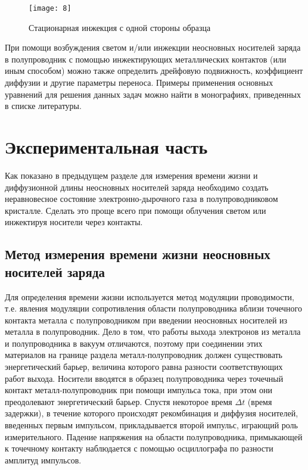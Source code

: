 \documentclass[a4paper,14pt]{extarticle}
\begin{document}
\begin{figure}[H]
	\centering
	\texttt{[image: 8]}
	\caption{Стационарная инжекция с одной стороны образца}
	\label{fig:figure7}
\end{figure}

При помощи возбуждения светом и/или инжекции неосновных носителей заряда в полупроводник с помощью инжектирующих металлических контактов (или иным способом) можно также определить дрейфовую подвижность, коэффициент диффузии и другие параметры переноса. Примеры применения основных уравнений для решения данных задач можно найти в монографиях, приведенных в списке литературы.


\section{Экспериментальная часть}
Как показано в предыдущем разделе для измерения времени жизни и диффузионной длины неосновных носителей заряда необходимо создать неравновесное состояние электронно-дырочного газа в полупроводниковом кристалле. Сделать это проще всего при помощи облучения светом или инжектируя носители через контакты.

\subsection{Метод измерения времени жизни неосновных носителей заряда}

Для определения времени жизни используется метод модуляции проводимости, т.е. явления модуляции сопротивления области полупроводника вблизи точечного контакта металла с полупроводником при введении неосновных носителей из металла в полупроводник. Дело в том, что работы выхода электронов из металла и полупроводника в вакуум отличаются, поэтому при соединении этих материалов на границе раздела металл-полупроводник должен существовать энергетический барьер, величина которого равна разности соответствующих работ выхода. Носители вводятся в образец полупроводника через точечный контакт металл-полупроводник при помощи импульса тока, при этом они преодолевают энергетический барьер. Спустя некоторое время $\Delta t$ (время задержки), в течение которого происходят рекомбинация и диффузия носителей, введенных первым импульсом, прикладывается второй импульс, играющий роль измерительного. Падение напряжения на области полупроводника, примыкающей к точечному контакту наблюдается с помощью осциллографа по разности амплитуд импульсов.
\end{document}
